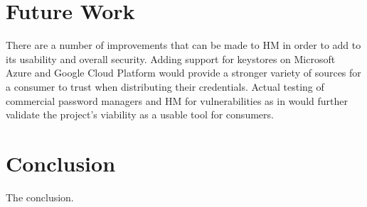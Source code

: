 \documentclass[conference]{IEEEtran}
\begin{document}
\section{Future Work}
There are a number of improvements that can be made to HM in order to add to its
usability and overall security. Adding support for keystores on Microsoft Azure
and Google Cloud Platform would provide a stronger variety of sources for a
consumer to trust when distributing their credentials. Actual testing of
commercial password managers and HM for vulnerabilities as in \cite{silver2014password}
would further validate the project's viability as a usable tool for consumers.

\section{Conclusion}
The conclusion.



\end{document}

